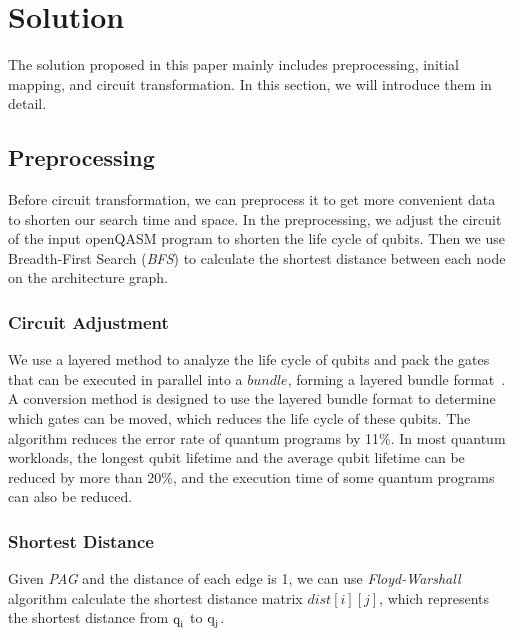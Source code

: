 \documentclass[runningheads]{llncs}
\begin{document}
\section{Solution}
\label{Solution}
The solution proposed in this paper mainly includes preprocessing, initial mapping, and circuit transformation. In this section, we will introduce them in detail.
\subsection{Preprocessing}
Before circuit transformation, we can preprocess it to get more convenient data to shorten our search time and space. In the preprocessing, we adjust the circuit of the input openQASM program to shorten the life cycle of qubits. Then we use Breadth-First Search (\textit{BFS}) to calculate the shortest distance between each node on the architecture graph.
\subsubsection{Circuit Adjustment}
We use a layered method to analyze the life cycle of qubits and pack the gates that can be executed in parallel into a $bundle$, forming a layered bundle format~\cite{2019Zhang}.
A conversion method is designed to use the layered bundle format to determine which gates can be moved, which reduces the life cycle of these qubits. The algorithm reduces the error rate of quantum programs by 11\%. In most quantum workloads, the longest qubit lifetime and the average qubit lifetime can be reduced by more than 20\%, and the execution time of some quantum programs can also be reduced.
\subsubsection{Shortest Distance}
Given \textit{PAG} and the distance of each edge is 1, we can use \textit{Floyd-Warshall} algorithm calculate the shortest distance matrix $dist[i][j]$, which represents the shortest distance from $\textup{q}_{\textup{i}}$ to $\textup{q}_{\textup{j}}$. 
\end{document}
